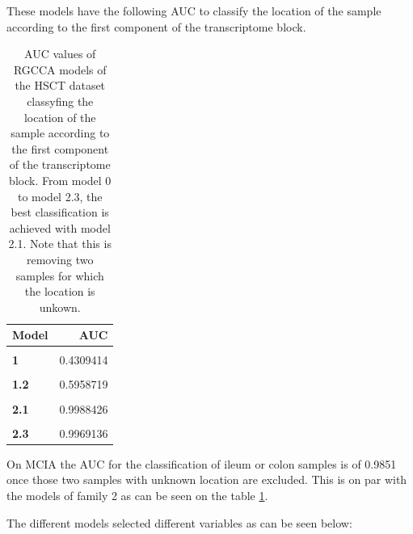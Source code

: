 \documentclass[
  a4paper,
]{book}
\begin{document}
These models have the following AUC to classify the location of the sample according to the first component of the transcriptome block.

\begin{table}[H]

\caption[AUC values of RGCCA models on the HSCT dataset.]{\label{tab:hsct-auc}AUC values of RGCCA models of the HSCT dataset classyfing the location of the sample according to the first component of the transcriptome block. From model 0 to model 2.3, the best classification is achieved with model 2.1. Note that this is removing two samples for which the location is unkown.}
\centering
\begin{tabular}[t]{>{}l||r}
\hline
Model & AUC\\
\hline
\textbf{\cellcolor{gray!6}{0}} & \cellcolor{gray!6}{0.4537037}\\
\hline
\textbf{1} & 0.4309414\\
\hline
\textbf{\cellcolor{gray!6}{1.1}} & \cellcolor{gray!6}{0.4639275}\\
\hline
\textbf{1.2} & 0.5958719\\
\hline
\textbf{\cellcolor{gray!6}{2}} & \cellcolor{gray!6}{0.9450231}\\
\hline
\textbf{2.1} & 0.9988426\\
\hline
\textbf{\cellcolor{gray!6}{2.2}} & \cellcolor{gray!6}{0.9980710}\\
\hline
\textbf{2.3} & 0.9969136\\
\hline
\end{tabular}
\end{table}

On MCIA the AUC for the classification of ileum or colon samples is of 0.9851 once those two samples with unknown location are excluded.
This is on par with the models of family 2 as can be seen on the table \ref{tab:hsct-auc}.

The different models selected different variables as can be seen below:
\end{document}
